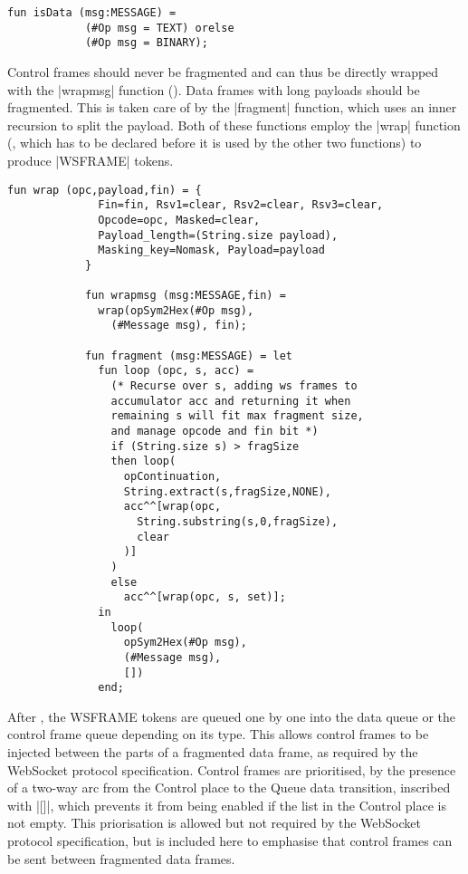 			\begin{lstlisting}[label=lst:isData,caption=isData,gobble=3,float=h]
			fun isData (msg:MESSAGE) =
			(#Op msg = TEXT) orelse
			(#Op msg = BINARY);
			\end{lstlisting}
			
			Control frames should never be fragmented and can thus be directly wrapped
			with the |wrapmsg| function ().
			Data frames with long payloads should be fragmented. This is taken care of by
			the |fragment| function, which uses an inner recursion to split the payload. 
			Both of these functions employ the |wrap| function (,
			which has to be declared before it is used by the other two functions) to
			produce |WSFRAME| tokens.
			
			
			\begin{lstlisting}[label=lst:fragment,caption=wrap wrapmsg and fragment,gobble=3,float] 
			fun wrap (opc,payload,fin) = { 
			  Fin=fin, Rsv1=clear, Rsv2=clear, Rsv3=clear,
			  Opcode=opc, Masked=clear,
			  Payload_length=(String.size payload),
			  Masking_key=Nomask, Payload=payload
			}
			
			fun wrapmsg (msg:MESSAGE,fin) = 
			  wrap(opSym2Hex(#Op msg), 
			    (#Message msg), fin);
			    
			fun fragment (msg:MESSAGE) = let
			  fun loop (opc, s, acc) = 
			    (* Recurse over s, adding ws frames to 
			    accumulator acc and returning it when 
			    remaining s will fit max fragment size,
			    and manage opcode and fin bit *)
			    if (String.size s) > fragSize
			    then loop(
			      opContinuation,
			      String.extract(s,fragSize,NONE),
			      acc^^[wrap(opc, 
			        String.substring(s,0,fragSize), 
			        clear
			      )]
			    )
			    else 
			      acc^^[wrap(opc, s, set)];
			  in 
			    loop(
			      opSym2Hex(#Op msg), 
			      (#Message msg), 
			      [])
			  end;
			\end{lstlisting}
			
			After , the WSFRAME tokens are queued
			one by one into the data queue or the control frame queue depending on its
			type. This allows control frames to be injected between the parts of a
			fragmented data frame, as required by the WebSocket protocol specification.
			Control frames are prioritised, by the presence of a two-way arc from the
			Control place to the Queue data transition, inscribed with |[]|, which
			prevents it from being enabled if the list in the Control place is not
			empty. This priorisation is allowed but not required by the WebSocket
			protocol specification, but is included here to emphasise that control
			frames can be sent between fragmented data frames.
		
